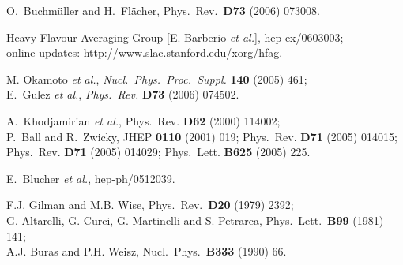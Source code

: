 \documentclass[11pt]{cernrep}
\begin{document}
\begin{thebibliography}{999}
  O.~Buchm\"uller and H.~Fl\"acher,
 Phys.\ Rev.\ {\bf D73} (2006) 073008.
  
Heavy Flavour Averaging Group [E. Barberio {\it et al.}], 
hep-ex/0603003;\\ online updates: http://www.slac.stanford.edu/xorg/hfag. 

M. Okamoto {\it et al.},
 {\it Nucl.\ Phys.\ Proc.\ Suppl.} {\bf 140} (2005) 461;\\
E.~Gulez {\it et al.},
{\it Phys.\ Rev.} {\bf D73} (2006) 074502.

A.~Khodjamirian {\it et al.},
{  Phys.\ Rev.} {\bf D62} (2000) 114002;\\
  P.~Ball and R.~Zwicky,
{  JHEP} {\bf 0110} (2001) 019;
{  Phys.\ Rev.} {\bf D71} (2005) 014015;
{ Phys.\ Rev.} {\bf D71} (2005) 014029;
{  Phys.\ Lett.} {\bf B625} (2005) 225.

E.~Blucher {\it et al.},
  hep-ph/0512039.

F.J. Gilman and M.B. Wise,
{ Phys.\ Rev.}~{\bf D20} (1979) 2392;\\
G. Altarelli, G. Curci, G. Martinelli and S. Petrarca,
{ Phys.\ Lett.}~{\bf B99} (1981) 141;\\
A.J. Buras and P.H. Weisz,
{ Nucl.\ Phys.}~{\bf B333} (1990) 66.


\end{thebibliography}
\end{document}
